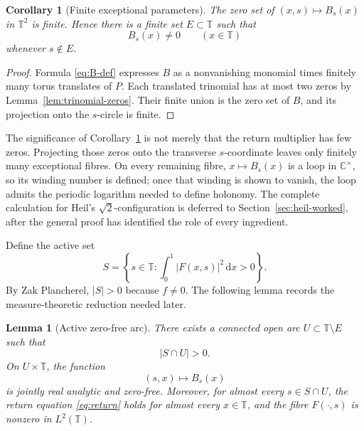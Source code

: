 \documentclass[reqno]{amsart}
\newtheorem{lemma}[theorem]{Lemma}
\newtheorem{corollary}[theorem]{Corollary}
\theoremstyle{remark}
\numberwithin{equation}{section}
\newcommand{\T}{\mathbb{T}}
\newcommand{\C}{\mathbb{C}}
\newcommand{\dd}{\,\mathrm{d}}
\begin{document}
\begin{corollary}[Finite exceptional parameters]
\label{cor:exceptional}
The zero set of \((x,s)\mapsto B_s(x)\) in \(\T^2\) is finite. Hence there
is a finite set \(E\subset\T\) such that
\begin{equation}
  B_s(x)\neq0
  \qquad (x\in\T)
  \label{eq:zero-free-fibre}
\end{equation}
whenever \(s\notin E\).
\end{corollary}

\begin{proof}
Formula \eqref{eq:B-def} expresses \(B\) as a nonvanishing monomial times
finitely many torus translates of \(P\). Each translated trinomial has at most
two zeros by Lemma~\ref{lem:trinomial-zeros}. Their finite union is the zero
set of \(B\), and its projection onto the \(s\)-circle is finite.
\end{proof}

The significance of Corollary~\ref{cor:exceptional} is not merely that the
return multiplier has few zeros. Projecting those zeros onto the transverse
\(s\)-coordinate leaves only finitely many exceptional fibres. On every
remaining fibre, \(x\mapsto B_s(x)\) is a loop in \(\C^\times\), so its
winding number is defined; once that winding is shown to vanish, the loop
admits the periodic logarithm needed to define holonomy. The complete
calculation for Heil's \(\sqrt2\)-configuration is deferred to
Section~\ref{sec:heil-worked}, after the general proof has identified the role
of every ingredient.

Define the active set
\begin{equation}
  S=
  \left\{
    s\in\T:
    \int_0^1|F(x,s)|^2\dd x>0
  \right\}.
  \label{eq:active-set}
\end{equation}
By Zak Plancherel, \(|S|>0\) because \(f\neq0\). The following lemma records
the measure-theoretic reduction needed later.

\begin{lemma}[Active zero-free arc]
\label{lem:active-arc}
There exists a connected open arc \(U\subset\T\setminus E\) such that
\begin{equation}
  |S\cap U|>0.
  \label{eq:active-arc}
\end{equation}
On \(U\times\T\), the function
\[
  (s,x)\longmapsto B_s(x)
\]
is jointly real analytic and zero-free. Moreover, for almost every
\(s\in S\cap U\), the return equation \eqref{eq:return} holds for almost every
\(x\in\T\), and the fibre \(F(\cdot,s)\) is nonzero in \(L^2(\T)\).
\end{lemma}
\end{document}
